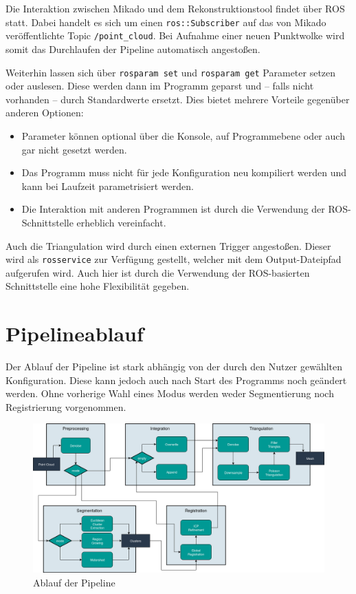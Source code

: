 Die Interaktion zwischen Mikado und dem Rekonstruktionstool findet über \ac{ROS} statt.
Dabei handelt es sich um einen \texttt{ros::Subscriber} auf das von Mikado veröffentlichte Topic \texttt{/point\_cloud}.
Bei Aufnahme einer neuen Punktwolke wird somit das Durchlaufen der Pipeline automatisch angestoßen.

Weiterhin lassen sich über \texttt{rosparam set} und \texttt{rosparam get} Parameter setzen oder auslesen.
Diese werden dann im Programm geparst und -- falls nicht vorhanden -- durch Standardwerte ersetzt.
Dies bietet mehrere Vorteile gegenüber anderen Optionen:

\begin{itemize}
\item Parameter können optional über die Konsole, auf Programmebene oder auch gar nicht gesetzt werden.
\item Das Programm muss nicht für jede Konfiguration neu kompiliert werden und kann bei Laufzeit parametrisiert werden.
\item Die Interaktion mit anderen Programmen ist durch die Verwendung der \ac{ROS}-Schnittstelle erheblich vereinfacht.
\end{itemize}

Auch die Triangulation wird durch einen externen Trigger angestoßen.
Dieser wird als \texttt{rosservice} zur Verfügung gestellt, welcher mit dem Output-Dateipfad aufgerufen wird.
Auch hier ist durch die Verwendung der \ac{ROS}-basierten Schnittstelle eine hohe Flexibilität gegeben.



\section{Pipelineablauf}
\label{sec:pipeline}

Der Ablauf der Pipeline ist stark abhängig von der durch den Nutzer gewählten Konfiguration.
Diese kann jedoch auch nach Start des Programms noch geändert werden.
Ohne vorherige Wahl eines Modus werden weder Segmentierung noch Registrierung vorgenommen.

\begin{figure}[H]
    \centering
	\includegraphics[width=\textwidth]{images/pipeline.png}
	\caption{Ablauf der Pipeline}
	\label{fig:pipeline}
\end{figure}

